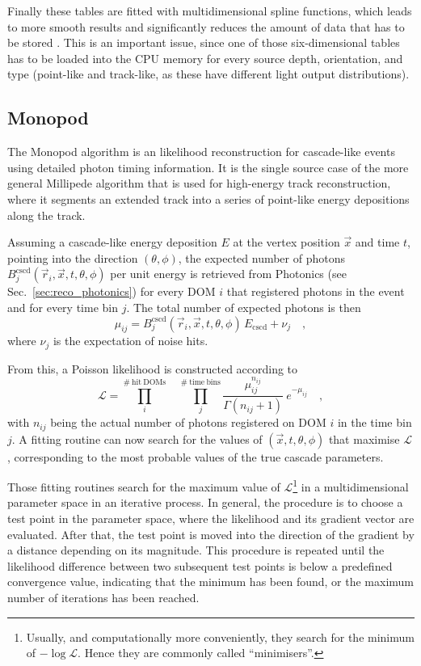 Finally these tables are fitted with multidimensional spline functions, which
leads to more smooth results and significantly reduces the amount of data that
has to be stored \cite{Photospline}. This is an important issue, since one
of those six-dimensional tables has to be loaded into the CPU memory for every
source depth, orientation, and type (point-like and track-like, as these have
different light output distributions).

\subsection{Monopod}
\label{sec:reco_monopod}

The Monopod algorithm is an likelihood reconstruction for cascade-like events
using detailed photon timing information. It is the single source case of the
more general Millipede algorithm \cite{Millipede} that is used for high-energy
track reconstruction, where it segments an extended track into a series of
point-like energy depositions along the track.

Assuming a cascade-like energy deposition $E$ at the vertex position $\vec{x}$
and time $t$, pointing into the direction $(\theta, \phi)$, the expected number
of photons $B^\mathrm{cscd}_j(\vec{r}_i, \vec{x}, t, \theta, \phi)$ per unit
energy is retrieved from Photonics (see Sec.~\ref{sec:reco_photonics}) for every
DOM $i$ that registered photons in the event and for every time bin $j$. The
total number of expected photons is then
\begin{equation}
 \mu_{ij} = B^\mathrm{cscd}_j(\vec{r}_i, \vec{x}, t, \theta, \phi)
             \,E_\mathrm{cscd} + \nu_j  \quad, \label{eqn:cscd_hypo}
\end{equation}
where $\nu_j$ is the expectation of noise hits.

From this, a Poisson likelihood is constructed according to
\begin{equation}
 \mathcal{L} = \prod_i^\mathrm{\#\ hit\ DOMs} 
   \quad \prod_{j}^\mathrm{\#\ time\ bins}
   \frac{\mu_{ij}^{n_{ij}}}{\Gamma\left(n_{ij}+1\right)}\ e^{-\mu_{ij}} \quad,
\end{equation}
with $n_{ij}$ being the actual number of photons registered on DOM $i$ in the
time bin $j$. A fitting routine can now search for the values of $(\vec{x}, t,
\theta, \phi)$ that maximise $\mathcal{L}$, corresponding to the most
probable values of the true cascade parameters.

Those fitting routines search for the maximum value of
$\mathcal{L}$\footnote{Usually, and computationally more conveniently, they
search for the minimum of $-\log\mathcal{L}$. Hence they are commonly called
``minimisers''.} in a multidimensional parameter
space in an iterative process. In general, the procedure is to choose a test
point in the parameter space, where the likelihood and its gradient vector are
evaluated. After that, the test point is moved into the direction of the
gradient by a distance depending on its magnitude. This procedure is repeated
until the likelihood difference between two subsequent test points is below a
predefined convergence value, indicating that the minimum has been found, or the
maximum number of iterations has been reached.

